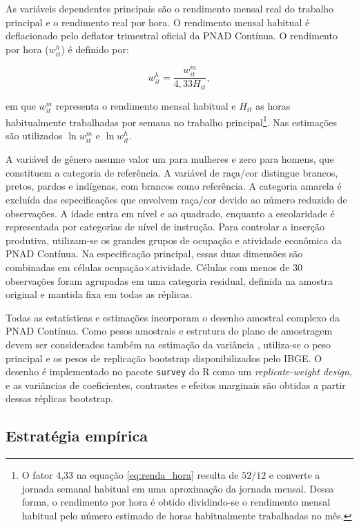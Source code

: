 \documentclass[12pt]{article}
\begin{document}
As variáveis dependentes principais são o rendimento mensal real do trabalho
principal e o rendimento real por hora. O rendimento mensal habitual é
deflacionado pelo deflator trimestral oficial da PNAD Contínua. O rendimento por
hora ($w^h_{it}$) é definido por:

\begin{equation}
    w^h_{it}=\frac{w^m_{it}}{4{,}33H_{it}},
    \label{eq:renda_hora}
\end{equation}

\noindent
em que $w^m_{it}$ representa o rendimento mensal habitual e $H_{it}$ as horas
habitualmente trabalhadas por semana no trabalho principal\footnote{O fator 4,33 na equação \ref{eq:renda_hora} resulta de $52/12$ e converte a jornada semanal habitual em uma aproximação da jornada mensal. Dessa forma, o rendimento por hora é obtido dividindo-se o rendimento mensal habitual pelo número estimado de horas habitualmente trabalhadas no mês.}. Nas estimações são
utilizados $\ln w^m_{it}$ e $\ln w^h_{it}$.

A variável de gênero assume valor um para mulheres e zero para homens, que
constituem a categoria de referência. A variável de raça/cor distingue brancos,
pretos, pardos e indígenas, com brancos como referência. A categoria amarela é
excluída das especificações que envolvem raça/cor devido ao número reduzido de
observações. A idade entra em nível e ao quadrado, enquanto a escolaridade é
representada por categorias de nível de instrução. Para controlar a inserção
produtiva, utilizam-se os grandes grupos de ocupação e atividade econômica da
PNAD Contínua. Na especificação principal, essas duas dimensões são combinadas
em células ocupação$\times$atividade. Células com menos de 30 observações foram
agrupadas em uma categoria residual, definida na amostra original e mantida
fixa em todas as réplicas.

Todas as estatísticas e estimações incorporam o desenho amostral complexo da
PNAD Contínua. Como pesos amostrais e estrutura do plano de amostragem devem ser
considerados também na estimação da variância
\citep{lumley2004analysis,lumley2010complex}, utiliza-se o peso principal e os 
pesos de replicação bootstrap disponibilizados pelo IBGE. O desenho é
implementado no pacote \texttt{survey} do R como um
\textit{replicate-weight design}, e as variâncias de coeficientes, contrastes e
efeitos marginais são obtidas a partir dessas réplicas bootstrap.

\subsection{Estratégia empírica}
\label{subsec:estrategia}
\end{document}
